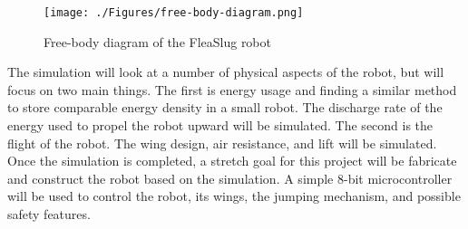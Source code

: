\begin{figure}[H]
\begin{center}
\texttt{[image: ./Figures/free-body-diagram.png]}
\caption{Free-body diagram of the FleaSlug robot}
\label{fig:free-body-diagram}
\end{center}
\end{figure}


\indent The simulation will look at a number of physical aspects of the robot, but will focus on two main things. The first is energy usage and finding a similar method to store comparable energy density in a small robot. The discharge rate of the energy used to propel the robot upward will be simulated. The second is the flight of the robot. The wing design, air resistance, and lift will be simulated.\\

\indent Once the simulation is completed, a stretch goal for this project will be fabricate and construct the robot based on the simulation. A simple 8-bit microcontroller will be used to control the robot, its wings, the jumping mechanism, and possible safety features.\\

